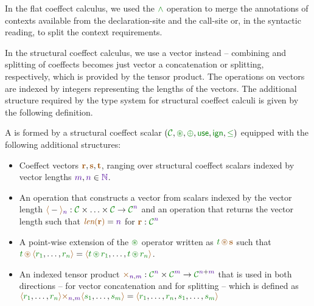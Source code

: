 \noindent
In the flat coeffect calculus, we used the $\czip$ operation to merge the annotations of contexts
available from the declaration-site and the call-site or, in the syntactic reading, to split the 
context requirements.

In the structural coeffect calculus, we use a vector instead -- combining and splitting of 
coeffects becomes just vector a concatenation or splitting, respectively, which is provided
by the tensor product. The operations on vectors are indexed by integers representing the lengths
of the vectors. The additional structure required by the type system for structural coeffect 
calculi is given by the following definition.

\begin{definition}
A \emph{} is formed by a structural coeffect scalar 
$(\C, \cseq, \cpar, \cunit, \czero, \cleq)$ equipped with the following additional structures:

\begin{itemize}
\item Coeffect vectors $\aclrd{\textbf{r}}, \aclrd{\textbf{s}}, \aclrd{\textbf{t}}$, ranging over
  structural coeffect scalars indexed by vector lengths $\sclrd{m}, \sclrd{n} \in \sclrd{\mathbb{N}}$.

\item An operation that constructs a vector from scalars indexed by the vector length
  $\alift{-}_{\sclrd{n}} : \C \times \ldots \times \C \rightarrow \C^{\sclrd{n}}$
  and an operation that returns the vector length such that 
  $\slift{\aclrd{\textbf{r}}} = \sclrd{n}$ for $\aclrd{\textbf{r}} : \C^{\sclrd{n}}$

\item A point-wise extension of the $\cseq$ operator written as $\cclrd{t} \,\aseq\, \aclrd{\textbf{s}}$
  such that\\ $\cclrd{t} \,\aseq\, \alift{\cclrd{r_1}, \ldots, \cclrd{r_n}} = 
    \alift{\cclrd{t} \,\cseq\,\cclrd{r_1}, \ldots, \cclrd{t} \,\cseq\,\cclrd{r_n}}$.

\item An indexed tensor product $\atimes_{\sclrd{n},\sclrd{m}} : \C^{\sclrd{n}} \times \C^{\sclrd{m}} \rightarrow \C^{\sclrd{n}+\sclrd{m}}$
  that is used in both directions -- for vector concatenation and for splitting -- 
  which is defined as $\alift{\cclrd{r_1}, \ldots, \cclrd{r_n}} 
     \atimes_{\sclrd{n}, \sclrd{m}} \alift{\cclrd{s_1}, \ldots, \cclrd{s_m}}
   = \alift{\cclrd{r_1}, \ldots, \cclrd{r_n}, \cclrd{s_1}, \ldots, \cclrd{s_m}}$
\end{itemize}
\end{definition}

